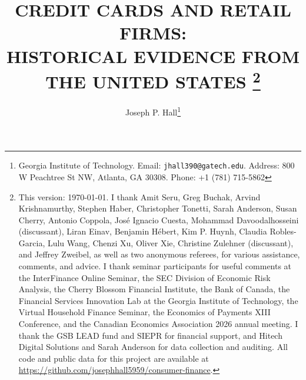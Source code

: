 \documentclass[12pt,english]{article}
\newif\ifblind
\begin{document}
\begin{singlespace}
\title{\textbf{\Large {CREDIT CARDS AND RETAIL FIRMS: 
} \\ {HISTORICAL EVIDENCE FROM THE UNITED STATES} \ifblind\else\thanks{{\footnotesize{}This version: \today. I thank Amit Seru, Greg Buchak, Arvind Krishnamurthy, Stephen Haber, Christopher Tonetti, Sarah Anderson, Susan Cherry, Antonio Coppola, Jos\'e Ignacio Cuesta, Mohammad Davoodalhosseini (discussant), Liran Einav, Benjamin H\'ebert, Kim P. Huynh, Claudia Robles-Garcia, Lulu Wang, Chenzi Xu, Oliver Xie, Christine Zulehner (discussant), and Jeffrey Zweibel, as well as two anonymous referees, for various assistance, comments, and advice. I thank seminar participants for useful comments at the InterFinance Online Seminar, the SEC Division of Economic Risk Analysis, the Cherry Blossom Financial Institute, the Bank of Canada, the Financial Services Innovation Lab at the Georgia Institute of Technology, the Virtual Household Finance Seminar, the Economics of Payments XIII Conference, and the Canadian Economics Association 2026 annual meeting. I thank the GSB LEAD fund and SIEPR for financial support, and Hitech Digital Solutions and Sarah Anderson for data collection and auditing. All code and public data for this project are available at \url{https://github.com/josephhall5959/consumer-finance}. %
}}\fi
}}


\ifblind
\author{}
\else
\author{%
\normalsize Joseph P. Hall\thanks{%
   Georgia Institute of Technology. {Email: \tt jhall390@gatech.edu}. Address: 800 W Peachtree St NW, Atlanta, GA 30308. Phone: +1 (781) 715-5862 }
      }
\fi


\date{}
\maketitle

\centering 



\end{singlespace}




\vspace{-0.25cm}
\end{document}
